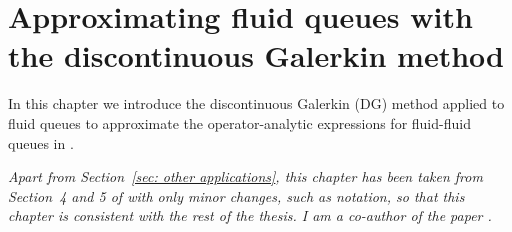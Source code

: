 \chapter{Approximating fluid queues with the discontinuous Galerkin method\label{ch:galerkin}} 

In this chapter we introduce the discontinuous Galerkin (DG) method applied to fluid queues to approximate the operator-analytic expressions for fluid-fluid queues in \cite{bo2014}. 
\begin{center}
	\begin{minipage}{0.8\textwidth}
		\textit{Apart from Section~\ref{sec: other applications}, this chapter has been taken from Section~4 and 5 of \cite{blnos2022} with only minor changes, such as notation, so that this chapter is consistent with the rest of the thesis. I am a co-author of the paper \cite{blnos2022}. %
		}
	\end{minipage}
	\end{center}


